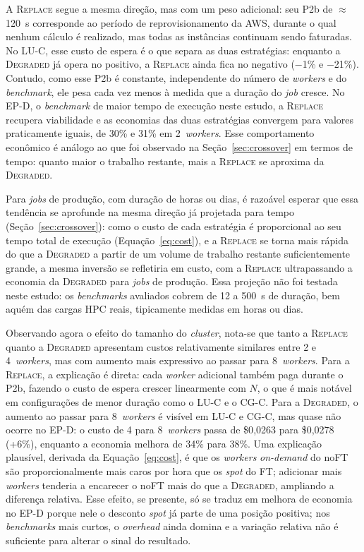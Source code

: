 A \textsc{Replace} segue a mesma direção, mas com um peso adicional: seu P2b de
$\approx$120~s corresponde ao período de reprovisionamento da AWS, durante o qual
nenhum cálculo é realizado, mas todas as instâncias continuam sendo faturadas. No
LU-C, esse custo de espera é o que separa as duas estratégias: enquanto a
\textsc{Degraded} já opera no positivo, a \textsc{Replace} ainda fica no negativo
($-$1\% e $-$21\%). Contudo, como esse P2b é constante, independente do número de
\textit{workers} e do \textit{benchmark}, ele pesa cada vez menos à medida que a
duração do \textit{job} cresce. No EP-D, o \textit{benchmark} de maior tempo de
execução neste estudo, a \textsc{Replace} recupera viabilidade e as economias das
duas estratégias convergem para valores praticamente iguais, de 30\% e 31\% em
2~\textit{workers}. Esse comportamento econômico é análogo ao que foi observado na
Seção~\ref{sec:crossover} em termos de tempo: quanto maior o trabalho restante, mais
a \textsc{Replace} se aproxima da \textsc{Degraded}.

Para \textit{jobs} de produção, com duração de horas ou dias, é razoável esperar
que essa tendência se aprofunde na mesma direção já projetada para tempo
(Seção~\ref{sec:crossover}): como o custo de cada estratégia é proporcional ao
seu tempo total de execução (Equação~\ref{eq:cost}), e a \textsc{Replace} se
torna mais rápida do que a \textsc{Degraded} a partir de um volume de trabalho
restante suficientemente grande, a mesma inversão se refletiria em custo, com a
\textsc{Replace} ultrapassando a economia da \textsc{Degraded} para \textit{jobs}
de produção. Essa projeção não foi testada neste estudo: os \textit{benchmarks}
avaliados cobrem de 12 a 500~s de duração, bem aquém das cargas HPC reais,
tipicamente medidas em horas ou dias.

Observando agora o efeito do tamanho do \textit{cluster}, nota-se que tanto a
\textsc{Replace} quanto a \textsc{Degraded} apresentam custos relativamente similares
entre 2 e 4~\textit{workers}, mas com aumento mais expressivo ao passar para
8~\textit{workers}. Para a \textsc{Replace}, a explicação é direta: cada
\textit{worker} adicional também paga durante o P2b, fazendo o custo de espera crescer
linearmente com $N$, o que é mais notável em configurações de menor duração como o
LU-C e o CG-C. Para a \textsc{Degraded}, o aumento ao passar para 8~\textit{workers}
é visível em LU-C e CG-C, mas quase não ocorre no EP-D: o custo de 4 para
8~\textit{workers} passa de \$0{,}0263 para \$0{,}0278 (+6\%), enquanto a economia
melhora de 34\% para 38\%. Uma explicação plausível, derivada da
Equação~\ref{eq:cost}, é que os \textit{workers} \textit{on-demand} do noFT são
proporcionalmente mais caros por hora que os \textit{spot} do FT; adicionar mais
\textit{workers} tenderia a encarecer o noFT mais do que a \textsc{Degraded},
ampliando a diferença relativa. Esse efeito, se presente, só se traduz em melhora
de economia no EP-D porque nele o desconto \textit{spot} já parte de uma posição
positiva; nos \textit{benchmarks} mais curtos, o \textit{overhead} ainda domina e a
variação relativa não é suficiente para alterar o sinal do resultado.


